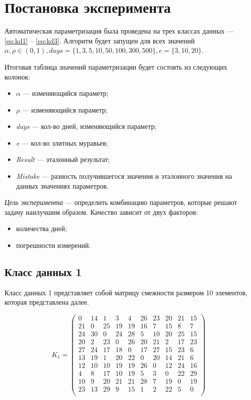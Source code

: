 \section{Постановка эксперимента}

Автоматическая параметризация была проведена на трех классах данных --- \ref{eq:kd1} -- \ref{eq:kd3}. Алгоритм будет запущен для всех значений $\alpha, \rho \in (0, 1), days = \{1, 3, 5, 10, 50, 100, 300, 500\}, e = \{3, 10, 20\}$.

Итоговая таблица значений параметризации будет состоять из следующих колонок:
\begin{itemize}
    \item $\alpha$ --- изменяющийся параметр;
    \item $\rho$ --- изменяющийся параметр;
    \item \textit{days} --- кол-во дней, изменяющийся параметр;
    \item \textit{e} --- кол-во элитных муравьев;
    \item \textit{Result} --- эталонный результат;
    \item \textit{Mistake} --- разность получившегося значения и эталонного значения на данных значениях параметров.
\end{itemize}

\textit{Цель эксперимента} --- определить комбинацию параметров, которые решают задачу наилучшим образом. Качество зависит от двух факторов:
\begin{itemize}
    \item количества дней;
    \item погрешности измерений.
\end{itemize}

\subsection{Класс данных 1}

Класс данных 1 представляет собой матрицу смежности размером 10 элементов, которая представлена далее.

\begin{equation}
    \label{eq:kd1}
	K_{1} = \begin{pmatrix}
		0 & 14 & 1 & 3 & 4 & 26 & 23 & 20 & 21 & 15 \\
		21 & 0 & 25 & 19 & 19 & 16 & 7 & 15 & 8 & 7 \\
		24 & 30 & 0 & 24 & 28 & 5 & 10 & 20 & 25 & 15 \\
		20 & 2 & 23 & 0 & 26 & 20 & 21 & 2 & 17 & 23 \\
		27 & 24 & 17 & 18 & 0 & 17 & 27 & 15 & 23 & 6 \\
		13 & 19 & 1 & 20 & 22 & 0 & 20 & 14 & 21 & 6 \\
		12 & 10 & 10 & 19 & 19 & 26 & 0 & 12 & 24 & 16 \\
		4 & 8 & 17 & 10 & 19 & 5 & 3 & 0 & 22 & 29 \\
		10 & 9 & 20 & 21 & 21 & 28 & 7 & 19 & 0 & 19 \\
		23 & 13 & 29 & 9 & 15 & 1 & 2 & 22 & 5 & 0 \\
	\end{pmatrix}
\end{equation}

